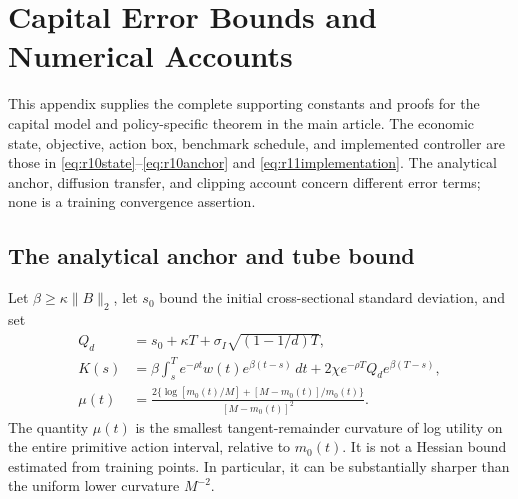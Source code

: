 \section{Capital Error Bounds and Numerical Accounts}
\label{app:r15capitalaccounts}
This appendix supplies the complete supporting constants and proofs for the
capital model and policy-specific theorem in the main article. The economic
state, objective, action box, benchmark schedule, and implemented controller
are those in \eqref{eq:r10state}--\eqref{eq:r10anchor} and
\eqref{eq:r11implementation}. The analytical anchor, diffusion transfer,
and clipping account concern different error terms; none is a training
convergence assertion.

\subsection{The analytical anchor and tube bound}
Let $\beta\geq\kappa\|B\|_2$, let $s_0$ bound the initial cross-sectional standard deviation, and set
\begin{align}
 Q_d&=s_0+\kappa T+\sigma_I\sqrt{(1-1/d)T},\label{eq:r10Q}\\
 K(s)&=\beta\int_s^T e^{-\rho t}w(t)e^{\beta(t-s)}\,dt
       +2\chi e^{-\rho T}Q_de^{\beta(T-s)},\label{eq:r10K}\\
 \mu(t)&=\frac{2\{\log[m_0(t)/M]+[M-m_0(t)]/m_0(t)\}}
                    {[M-m_0(t)]^2}.\label{eq:r10mu}
\end{align}
The quantity $\mu(t)$ is the smallest tangent-remainder curvature of log utility on the entire primitive action interval, relative to $m_0(t)$. It is not a Hessian bound estimated from training points. In particular, it can be substantially sharper than the uniform lower curvature $M^{-2}$.

